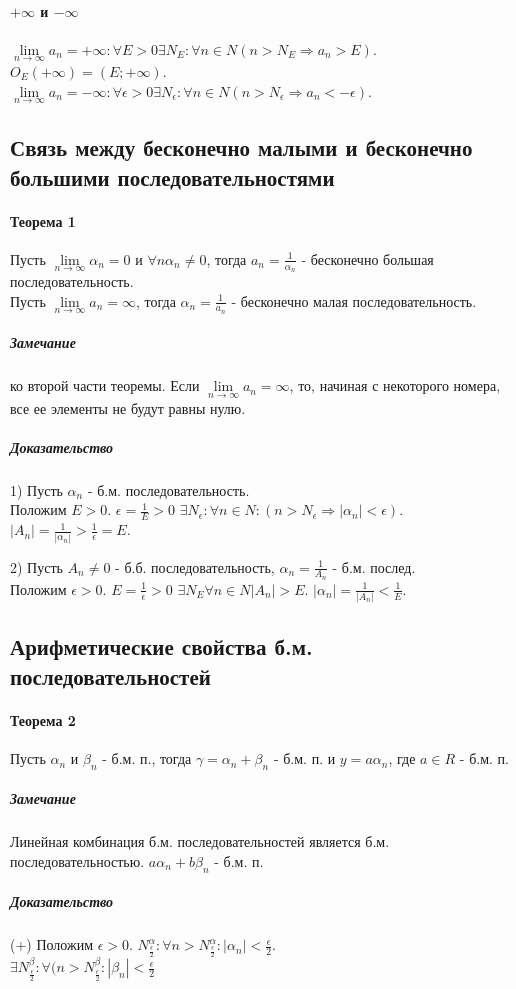 \documentclass[10pt]{article}
\newcommand{\limninf}{\lim\limits_{n \to \infty}}
\begin{document}
		\paragraph{$+\infty$ и $-\infty$}
		$\limninf a_n = +\infty : \forall E > 0 \exists N_E : \forall n \in N (n > N_E \Rightarrow a_n > E)$. $O_E(+\infty) = (E; +\infty)$.\\
		$\limninf a_n = -\infty : \forall \epsilon > 0 \exists N_\epsilon : \forall n \in N (n > N_\epsilon \Rightarrow a_n < -\epsilon)$.
		
		\subsection{Связь между бесконечно малыми и бесконечно большими последовательностями}
			\paragraph{Теорема 1}
			Пусть $\limninf \alpha_n = 0$ и $\forall n \alpha_n \neq 0$, тогда $a_n = \frac{1}{\alpha_n}$ - бесконечно большая последовательность.\\
			Пусть $\limninf a_n = \infty$, тогда $\alpha_n = \frac{1}{a_n}$ - бесконечно малая последовательность.
			\subparagraph{Замечание} ко второй части теоремы.
			Если $\limninf a_n = \infty$, то, начиная с некоторого номера, все ее элементы не будут равны нулю.
			\subparagraph{Доказательство} 1) Пусть $\alpha_n$ - б.м. последовательность.\\
			Положим $E > 0$. $\epsilon = \frac{1}{E} > 0$ $\exists N_\epsilon : \forall n \in N : (n > N_\epsilon \Rightarrow |\alpha_n| < \epsilon)$. $|A_n| = \frac{1}{|\alpha_n|} > \frac{1}{\epsilon} = E$.
			
			2) Пусть $A_n \neq 0$ - б.б. последовательность, $\alpha_n = \frac{1}{A_n}$ - б.м. послед.\\
			Положим $\epsilon > 0$. $E = \frac{1}{\epsilon} > 0$ $\exists N_E \forall n \in N |A_n| > E$. $|\alpha_n| = \frac{1}{|A_n|} < \frac{1}{E}$.
		\subsection{Арифметические свойства б.м. последовательностей}
			\paragraph{Теорема 2}
			Пусть $\alpha_n$ и $\beta_n$ - б.м. п., тогда $\gamma = \alpha_n + \beta_n$ - б.м. п. и $y = a\alpha_n$, где $a \in R$ - б.м. п.
			\subparagraph{Замечание}
			Линейная комбинация б.м. последовательностей является б.м. последовательностью. $a\alpha_n + b\beta_n$ - б.м. п.
			\subparagraph{Доказательство}
			(+) Положим $\epsilon > 0$. $N_{\frac{\epsilon}{2}}^\alpha : \forall n > N_{\frac{\epsilon}{2}}^\alpha : |\alpha_n| < \frac{\epsilon}{2}$.\\
			$\exists N_{\frac{\epsilon}{2}}^\beta : \forall(n > N_{\frac{\epsilon}{2}}^\beta : |\beta_n| < \frac{\epsilon}{2}$
			
\end{document}
